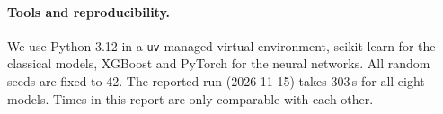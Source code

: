 \paragraph{Tools and reproducibility.} We use Python 3.12 in a \texttt{uv}-managed virtual environment, scikit-learn \cite{pedregosa2011sklearn} for the classical models, XGBoost \cite{xgboost} and PyTorch \cite{pytorch} for the neural networks. All random seeds are fixed to 42. The reported run (2026-11-15) takes 303\,s for all eight models. Times in this report are only comparable with each other.
